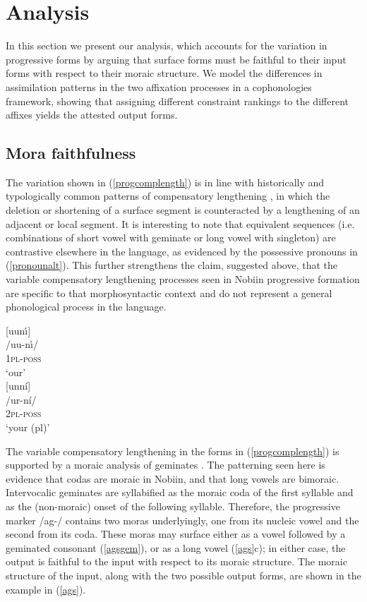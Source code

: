 \documentclass[output=paper]{langscibook}
\begin{document}
\section{Analysis} \label{analysis}
In this section we present our analysis, which accounts for the variation in progressive forms by arguing that surface forms must be faithful to their input forms with respect to their moraic structure. We model the differences in assimilation patterns in the two affixation processes in a cophonologies framework, showing that assigning different constraint rankings to the different affixes yields the attested output forms. 

\subsection{Mora faithfulness}
The variation shown in (\ref{progcomplength}) is in line with historically and typologically common patterns of compensatory lengthening \citep{hayes89, quantity},  in which the deletion or shortening of a surface segment is counteracted by a lengthening of an adjacent or local segment. It is interesting to note that equivalent sequences (i.e. combinations of short vowel with geminate or long vowel with singleton) are contrastive elsewhere in the language, as evidenced by the possessive pronouns in (\ref{pronounalt}). This further strengthens the claim, suggested above, that the variable compensatory lengthening processes seen in Nobiin progressive formation are specific to that morphosyntactic context and do not represent a general phonological process in the language. 

\ea \label{pronounalt}
\begin{multicols}{2}
\begin{xlist}
\ex {}[uun\'\i]\\
/uu-n\'\i/\\
\textsc{1pl-poss}\\
`our'\\
\ex {}[unn\'i]\\
/ur-n\'i/\\
\textsc{2pl-poss}\\
`your (pl)'\\
\end{xlist}
\end{multicols}
\z


The variable compensatory lengthening in the forms in (\ref{progcomplength}) is supported by a moraic analysis of geminates \citep{mccarthy, scheinsteriade}. The patterning seen here is evidence that codas are moraic in Nobiin, and that long vowels are bimoraic. Intervocalic geminates are syllabified as the moraic coda of the first syllable and as the (non-moraic) onset of the following syllable. Therefore, the progressive marker /ag-/ contains two moras underlyingly, one from its nucleic vowel and the second from its coda. These moras may surface either as a vowel followed by a geminated consonant (\ref{agsgem}), or as a long vowel (\ref{ags}c); in either case, the output is faithful to the input with respect to its moraic structure. The moraic structure of the input, along with the two possible output forms, are shown in the example in (\ref{ags}).
\end{document}
